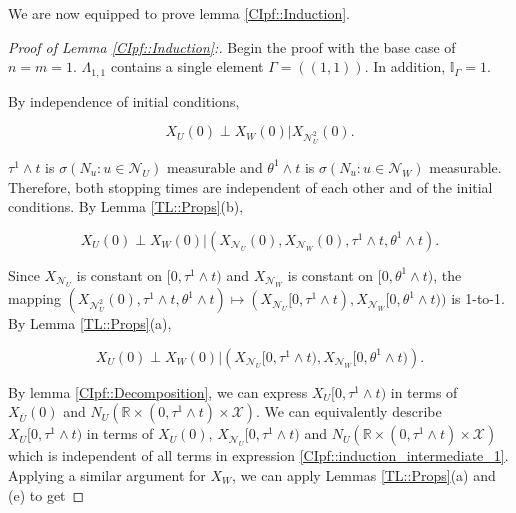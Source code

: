 \documentclass[12pt]{article}
\newcommand{\mb}{\mathbb}
\newcommand{\mc}{\mathcal}
\newcommand{\ov}{\overline}
\newcommand{\ind}{\hspace{24pt}}
\newcommand{\sta}{\mc{X}}							%
\newcommand{\neigh}[1]{\mc{N}_{#1}}					%
\newcommand{\dneigh}[1]{\mc{N}^2_{#1}}				%
\newcommand{\cl}[1]{\ov{#1}}						%
\newcommand{\indx}[1]{^{#1}}						%
\newcommand{\Xf}{X}									%
\newcommand{\poiss}{N}								%
\newcommand{\poissv}[1]{_{#1}}						%
\newcommand{\vind}[1]{_{#1}}						%
\newcommand{\tme}[1]{(#1)}							%
\newcommand{\tmi}[1]{#1}							%
\newcommand{\seto}{U}								%
\newcommand{\sett}{W}								%
\newcommand{\rtt}{\theta}							%
\newcommand{\apath}{\Gamma}						%
\newcommand{\pathset}[2]{\Lambda_{#1,#2}}		%
\newcommand{\indo}{n}							%
\newcommand{\indt}{m}							%
\newcommand{\rt}{\tau}								%
\begin{document}
We are now equipped to prove lemma \ref{CIpf::Induction}.

\begin{proof}[Proof of Lemma \ref{CIpf::Induction}:]

Begin the proof with the base case of \(\indo=\indt =1\). \(\pathset{1}{1}\) contains a single element \(\apath = ((1,1))\). In addition, \(\mb{I}_{\apath} = 1\).

\ind By independence of initial conditions,

\[\Xf\vind{\seto}\tme{0}\perp \Xf\vind{\sett}\tme{0}|\Xf\vind{\dneigh{\seto}}\tme{0}.\]

\(\rt\indx{1}\wedge t\) is \(\sigma\left(\poiss\poissv{u}:u\in \neigh{\seto}\right)\) measurable and \(\rtt\indx{1}\wedge t\) is \(\sigma\left(\poiss\poissv{u}:u\in \neigh{\sett}\right)\) measurable. Therefore, both stopping times are independent of each other and of the initial conditions. By Lemma \ref{TL::Props}(b), 

\[\Xf\vind{\seto}\tme{0}\perp \Xf\vind{\sett}\tme{0}|\left(\Xf\vind{\neigh{\seto}}\tme{0},\Xf\vind{\neigh{\sett}}\tme{0},\rt\indx{1}\wedge t,\rtt\indx{1}\wedge t\right).\]

Since \(\Xf\vind{\neigh{\seto}}\) is constant on \([0,\rt\indx{1}\wedge t)\) and \(\Xf\vind{\neigh{\sett}}\) is constant on \([0,\rtt\indx{1}\wedge t)\), the mapping \((\Xf\vind{\dneigh{\seto}}\tme{0},\rt\indx{1}\wedge t,\rtt\indx{1}\wedge t) \mapsto (\Xf\vind{\neigh{\seto}}\tmi{[0,\rt\indx{1}\wedge t)},\Xf\vind{\neigh{\sett}}\tmi{[0,\rtt\indx{1}\wedge t)})\) is 1-to-1. By Lemma \ref{TL::Props}(a),

\begin{equation}
\Xf\vind{\seto}\tme{0}\perp \Xf\vind{\sett}\tme{0}|\left(\Xf\vind{\neigh{\seto}}\tmi{[0,\rt\indx{1}\wedge t)},\Xf\vind{\neigh{\sett}}\tmi{[0,\rtt\indx{1}\wedge t)}\right).
\label{CIpf::induction_intermediate_1}
\end{equation}

By lemma \ref{CIpf::Decomposition}, we can express \(\Xf\vind{\seto}\tmi{[0,\rt\indx{1}\wedge t)}\) in terms of \(\Xf\vind{\cl{\seto}}\tme{0}\) and \(\poiss\poissv{\seto}(\mb{R} \times (0,\rt\indx{1}\wedge t)\times\sta)\). We can equivalently describe \(\Xf\vind{\seto}\tmi{[0,\rt\indx{1}\wedge t)}\) in terms of \(\Xf\vind{\seto}\tme{0}\), \(\Xf\vind{\neigh{\seto}}\tmi{[0,\rt\indx{1}\wedge t)}\) and \(\poiss\poissv{\seto}(\mb{R}\times (0,\rt\indx{1}\wedge t)\times \sta)\) which is independent of all terms in expression \eqref{CIpf::induction_intermediate_1}. Applying a similar argument for \(\Xf\vind{\sett}\), we can apply Lemmas \ref{TL::Props}(a) and (e) to get


\end{proof}
\end{document}
